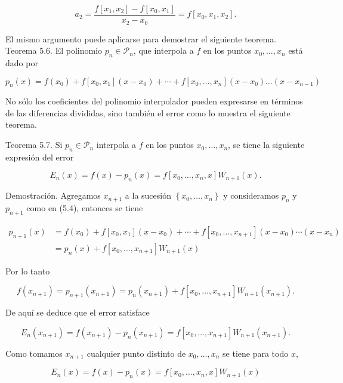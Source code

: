 \documentclass[10pt]{book}
\begin{document}
$$
a_{2}=\frac{f\left[x_{1}, x_{2}\right]-f\left[x_{0}, x_{1}\right]}{x_{2}-x_{0}}=f\left[x_{0}, x_{1}, x_{2}\right] .
$$

El mismo argumento puede aplicarse para demostrar el siguiente teorema.\\
Teorema 5.6. El polinomio $p_{n} \in \mathcal{P}_{n}$, que interpola a $f$ en los puntos $x_{0}, \ldots, x_{n}$ está dado por


\begin{equation*}
p_{n}(x)=f\left(x_{0}\right)+f\left[x_{0}, x_{1}\right]\left(x-x_{0}\right)+\cdots+f\left[x_{0}, \ldots, x_{n}\right]\left(x-x_{0}\right) \ldots\left(x-x_{n-1}\right) \tag{5.4}
\end{equation*}


No sólo los coeficientes del polinomio interpolador pueden expresarse en términos de las diferencias divididas, sino también el error como lo muestra el siguiente teorema.

Teorema 5.7. Si $p_{n} \in \mathcal{P}_{n}$ interpola a $f$ en los puntos $x_{0}, \ldots, x_{n}$, se tiene la siguiente expresión del error

$$
E_{n}(x)=f(x)-p_{n}(x)=f\left[x_{0}, \ldots, x_{n}, x\right] W_{n+1}(x) .
$$

Demostración. Agregamos $x_{n+1}$ a la sucesión $\left\{x_{0}, \ldots, x_{n}\right\}$ y consideramos $p_{n}$ y $p_{n+1}$ como en (5.4), entonces se tiene

$$
\begin{aligned}
p_{n+1}(x) & =f\left(x_{0}\right)+f\left[x_{0}, x_{1}\right]\left(x-x_{0}\right)+\cdots+f\left[x_{0}, \ldots, x_{n+1}\right]\left(x-x_{0}\right) \cdots\left(x-x_{n}\right) \\
& =p_{n}(x)+f\left[x_{0}, \ldots, x_{n+1}\right] W_{n+1}(x)
\end{aligned}
$$

Por lo tanto

$$
f\left(x_{n+1}\right)=p_{n+1}\left(x_{n+1}\right)=p_{n}\left(x_{n+1}\right)+f\left[x_{0}, \ldots, x_{n+1}\right] W_{n+1}\left(x_{n+1}\right) .
$$

De aquí se deduce que el error satisface

$$
E_{n}\left(x_{n+1}\right)=f\left(x_{n+1}\right)-p_{n}\left(x_{n+1}\right)=f\left[x_{0}, \ldots, x_{n+1}\right] W_{n+1}\left(x_{n+1}\right) .
$$

Como tomamos $x_{n+1}$ cualquier punto distinto de $x_{0}, \ldots, x_{n}$ se tiene para todo $x$,

$$
E_{n}(x)=f(x)-p_{n}(x)=f\left[x_{0}, \ldots, x_{n}, x\right] W_{n+1}(x)
$$
\end{document}
